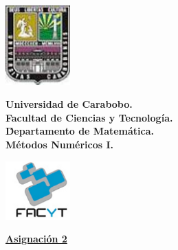 \documentclass[12pt,letterpaper]{article}
\begin{document}
\begin{minipage}[ht]{3cm}
\includegraphics[width=2.5cm]{Logouc.jpg}
\end{minipage}
\begin{minipage}{10cm}
\centering\textbf{Universidad de Carabobo.\\
 Facultad de Ciencias y Tecnolog\'ia.\\
\'Departamento de Matem\'atica.\\
 M\'etodos Num\'ericos I.\\
}
\end{minipage}
\begin{minipage}[ht]{4cm}
\includegraphics[width=2.5cm]{facyt.jpg}
\end{minipage}

\begin{center}
\underline{\textbf{Asignaci\'on 2}}\\[7pt]
\end{center}

\vspace{0.5cm}
\end{document}
